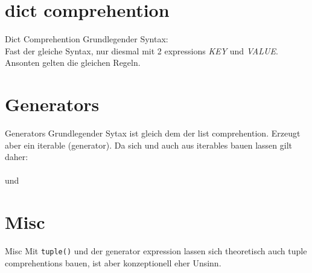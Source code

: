 \section{dict comprehention}
\begin{frame}{Dict Comprehention}
  Grundlegender Syntax: \\
  Fast der gleiche Syntax, nur diesmal mit 2 expressions \textit{KEY} und \textit{VALUE}. Ansonten gelten die gleichen Regeln.
\end{frame}


\section{Generators}
\begin{frame}{Generators}
  Grundlegender Sytax ist gleich dem der list comprehention. Erzeugt aber ein iterable (generator).
	Da sich  und  auch aus iterables bauen lassen gilt daher:\\

		\\
		und\\

\end{frame}


\section{Misc}
\begin{frame}{Misc}
  Mit \texttt{tuple()} und der generator expression lassen sich theoretisch auch tuple comprehentions bauen, ist aber konzeptionell eher Unsinn.
\end{frame}



